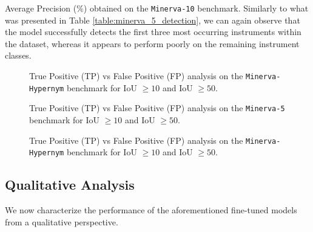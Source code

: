 \begin{table}[ht!]
	\caption{Average Precision ($\%$) obtained on the \texttt{Minerva-10} benchmark. Similarly to what was presented in Table \ref{table:minerva_5_detection}, we can again observe that the model successfully detects the first three most occurring instruments within the dataset, whereas it appears to perform poorly on the remaining instrument classes.}
\resizebox{\columnwidth}{!}{%
}
\label{table:minerva_10_detection}
\end{table}


\begin{figure}[htb!]
	\scalebox{0.8}{}
	\caption{True Positive (TP) vs False Positive (FP) analysis on the \texttt{Minerva-Hypernym} benchmark for IoU $\geq10$ and IoU $\geq50$.}
	\label{fig:detection_experiment_2}
\end{figure}



\begin{figure}[htb!]
	\scalebox{0.8}{}
	\caption{True Positive (TP) vs False Positive (FP) analysis on the \texttt{Minerva-5} benchmark for IoU $\geq10$ and IoU $\geq50$.}
	\label{fig:detection_experiment_3}
\end{figure}


\begin{figure}[htb!]
	\scalebox{0.8}{}
	\caption{True Positive (TP) vs False Positive (FP) analysis on the \texttt{Minerva-Hypernym} benchmark for IoU $\geq10$ and IoU $\geq50$.}
	\label{fig:detection_experiment_4}
\end{figure}



\subsection{Qualitative Analysis}
\label{sec:qualitative_analysis}
We now characterize the performance of the aforementioned fine-tuned models from a qualitative perspective. 

